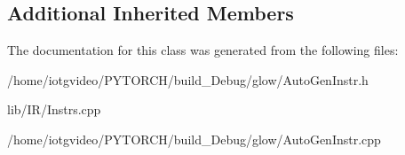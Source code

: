 \subsection*{Additional Inherited Members}


The documentation for this class was generated from the following files\+:\begin{DoxyCompactItemize}
\item 
/home/iotgvideo/\+P\+Y\+T\+O\+R\+C\+H/build\+\_\+\+Debug/glow/Auto\+Gen\+Instr.\+h\item 
lib/\+I\+R/Instrs.\+cpp\item 
/home/iotgvideo/\+P\+Y\+T\+O\+R\+C\+H/build\+\_\+\+Debug/glow/Auto\+Gen\+Instr.\+cpp\end{DoxyCompactItemize}

